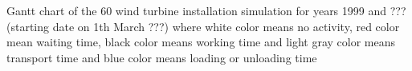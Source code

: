 \label{fig:gantt}
Gantt chart of the 60 wind turbine installation simulation for years 1999 and ??? (starting date on 1th March ???) where white color means no activity, red color mean waiting time, black color means working time and light gray color means transport time and blue color means loading or unloading time